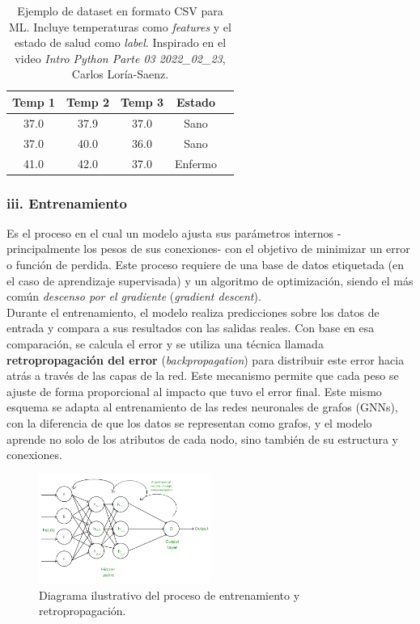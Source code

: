 \documentclass[11pt]{article} %
\begin{document}
\begin{table}[h]
\centering
\caption{Ejemplo de dataset en formato CSV para ML. Incluye temperaturas como \textit{features} y el estado de salud como \textit{label}. Inspirado en el video \textit{Intro Python Parte 03 2022\_02\_23}, Carlos Loría-Saenz.}
\label{tab:ml_dataset_example}
\begin{tabular}{|c|c|c|c|c|}
\hline
\textbf{Temp 1} & \textbf{Temp 2} & \textbf{Temp 3} & \textbf{Estado} \\
\hline
37.0 & 37.9 & 37.0 & Sano \\
37.0 & 40.0 & 36.0 & Sano \\
41.0 & 42.0 & 37.0 & Enfermo \\
\hline
\end{tabular}
\end{table}
\vspace{8pt}
\subsubsection*{iii. Entrenamiento}
Es el proceso en el cual un modelo ajusta sus parámetros internos -principalmente los pesos de sus conexiones- con el objetivo de minimizar un error o función de perdida. Este proceso requiere de una base de datos etiquetada (en el caso de aprendizaje supervisada) y un algoritmo de optimización, siendo el más común \textit{descenso por el gradiente} (\textit{gradient descent}).\\[1pt]
Durante el entrenamiento, el modelo realiza predicciones sobre los datos de entrada y compara a sus resultados con las salidas reales. Con base en esa comparación, se calcula el error y se utiliza una técnica llamada \textbf{retropropagación del error} 
(\textit{backpropagation}) para distribuir este error hacia atrás a través de las capas de la red. Este mecanismo permite que cada peso se ajuste de forma proporcional al impacto que tuvo el error final. Este mismo esquema se adapta al entrenamiento de las redes neuronales de grafos (GNNs), con la diferencia de que los datos se representan como grafos, y el modelo aprende no solo de los atributos de cada nodo, sino también de su estructura y conexiones.
\begin{figure}[H]
    \centering
    \includegraphics[width = 0.5\textwidth]{Images/Frame-13.png}
    \caption{Diagrama ilustrativo del proceso de entrenamiento y retropropagación.}
    \label{fig:Backpropagaion}
\end{figure}
\vspace{8pt}
\end{document}
